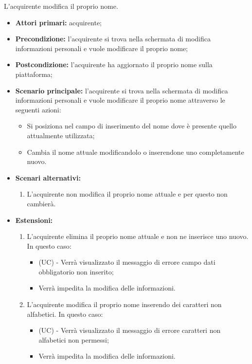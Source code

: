 \resetSubUC

L'acquirente modifica il proprio nome.
\begin{itemize}
    \item \textbf{Attori primari:} acquirente;
    \item \textbf{Precondizione:} l'acquirente si trova nella schermata di modifica informazioni personali e vuole modificare il proprio nome;
    \item \textbf{Postcondizione:} l'acquirente ha aggiornato il proprio nome sulla piattaforma;
    \item \textbf{Scenario principale:} l'acquirente si trova nella schermata di modifica informazioni personali e vuole modificare il proprio nome attraverso le seguenti azioni:
        \begin{itemize}
            \item Si posiziona nel campo di inserimento del nome dove è presente quello attualmente utilizzata;
            \item Cambia il nome attuale modificandolo o inserendone uno completamente nuovo.
        \end{itemize}
    \item \textbf{Scenari alternativi:} 
    \begin{enumerate}[label=\lett]
        \item L'acquirente non modifica il proprio nome attuale e per questo non cambierà.
    \end{enumerate}
    \item \textbf{Estensioni:} 
    \begin{enumerate}[label=\lett]
        \item L'acquirente elimina il proprio nome attuale e non ne inserisce uno nuovo. In questo caso:
        \begin{itemize}
            \item (UC) - Verrà visualizzato il messaggio di errore campo dati obbligatorio non inserito;
            \item Verrà impedita la modifica delle informazioni.
        \end{itemize}
        \item L'acquirente modifica il proprio nome inserendo dei caratteri non alfabetici. In questo caso:
        \begin{itemize}
            \item (UC) - Verrà visualizzato il messaggio di errore caratteri non alfabetici non permessi;
            \item Verrà impedita la modifica delle informazioni.
        \end{itemize}
    \end{enumerate}
\end{itemize}

